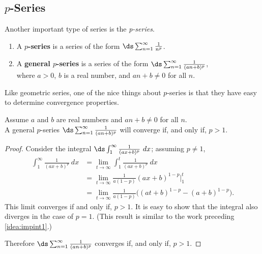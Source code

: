 \subsection{\texorpdfstring{$p$}{p}-Series}

Another important type of series is the \emph{p-series}.

\begin{definition}\label{def:pseries}
\begin{enumerate}
\item	A \textbf{$p$-series} is a series of the form
\qquad$\ds\sum_{n=1}^\infty \frac{1}{n^p}$.
\item	A \textbf{general $p$-series} is a series of the form 
\qquad$\ds\sum_{n=1}^\infty \frac{1}{(an+b)^p}$,\medskip\\
where $a>0$, $b$ is a real number, and $an+b\neq 0$ for all $n$.
\end{enumerate}
\end{definition}

Like geometric series, one of the nice things about $p$-series is that they have easy to determine convergence properties.

\begin{theorem}\label{thm:pseries}
Assume $a$ and $b$ are real numbers and  $an+b\neq 0$ for all $n$.\\
A general $p$-series $\ds\sum_{n=1}^\infty \frac{1}{(an+b)^p}$ will converge if, and only if, $p>1$.
\end{theorem}

\begin{proof}
Consider the integral $\ds\int_1^\infty \frac1{(ax+b)^p}\ dx$; assuming $p\neq 1$,
\begin{align*}
	\int_1^\infty \frac1{(ax+b)^p}\ dx
	&= \lim_{t\to\infty} \int_1^t \frac1{(ax+b)^p}\ dx \\
	&= \lim_{t\to\infty} \frac{1}{a(1-p)}(ax+b)^{1-p}\Big|_1^t\\
	&= \lim_{t\to\infty} \frac{1}{a(1-p)}\big((at+b)^{1-p}-(a+b)^{1-p}\big).
\end{align*}
This limit converges if and only if, $p>1$. It is easy to show that the integral also diverges in the case of $p=1$. (This result is similar to the work preceding \autoref{idea:impint1}.)

Therefore $\ds \sum_{n=1}^\infty \frac 1{(an+b)^p}$ converges if, and only if, $p>1$.
\end{proof}

